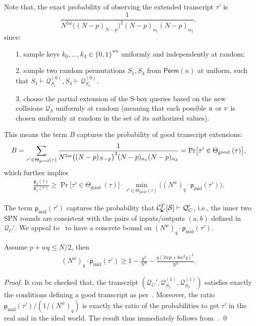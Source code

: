Note that, the exact probability of observing the extended transcript $\tau'$ is
%
%
$$\frac{1}{N^{5w}\big((N-p)_{N-p}\big)^2(N-p)_{\alpha_1}(N-p)_{\alpha_2}},$$
%
since:
%
\begin{itemize}
	\item[1.] sample keys $k_0,\ldots,k_4\in\{0,1\}^{wn}$ uniformly and independently at random;
	\item[2.] sample two random permutations $S_1,S_4$ from $\mathsf{Perm}(n)$ at uniform, such that $S_1\vdash\mathcal{Q}_{S_1}^{(0)},S_4\vdash\mathcal{Q}_{S_4}^{(0)}$.
	\item[3.] choose the partial extension of the S-box queries based on the new collisions $\mathcal{Q}_{S}^{\prime}$ uniformly at random (meaning that each possible $\mathnormal{u}$ or $\mathnormal{v}$ is chosen uniformly at random in the set of its authorized values).
\end{itemize}
%
%
This means the term $B$ captures the probability of good transcript extensions:
%
%
\begin{align}
B=\sum_{\tau^{\prime} \in \Theta_{\mathrm{good}}(\tau)}
\frac{1}{N^{5w}\big((N-p)_{N-p}\big)^2(N-p)_{\alpha_1}(N-p)_{\alpha_2}}={\Pr}\big[ \tau' \in \Theta_{\text {good }}(\tau)\big],   \notag
\end{align}
%
%
which further implies
%
%
\begin{align}
\frac{\mathsf{p}_{2}(\tau)}{\mathsf{p}_{1}(\tau)}   \geq  {\Pr}\big[ \tau' \in \Theta_{\text {good }}(\tau)\big]\cdot
\min_{\tau' \in \Theta_{\mathrm{good}}(\tau)}\big((N^w)_q\cdot\mathsf{p}_{\mathrm{mid}}(\tau')\big). 
\label{eq:ratio-divide-4-rounds}
\end{align}
%
%


The term $\mathsf{p}_{\mathrm{mid}}(\tau')$ captures the probability that $\mathcal{C}_{\mathbf{k}'}^T[\mathcal{S}] \vdash \mathcal{Q}_C'$, i.e., the inner two SPN rounds are consistent with the pairs of inputs/outputs $(a,b)$ defined in $\mathcal{Q}_C'$. We appeal to~\cite{EPRINT:CogLee18} to have a concrete bound on $(N^w)_q\cdot\mathsf{p}_{\mathrm{mid}}(\tau')$.

\begin{lemma}
	\label{lemma:bound-middle-two-rounds}
	
	Assume $p+wq\leq N/2$, then
	\begin{align}
	(N^w)_q\cdot\mathsf{p}_{\mathrm{mid}}(\tau') \geq 1-\frac{q^2}{N^w}-\frac{q(2wp+6w^2q)^2}{N^2}.
	\label{eq:bound-on-epsilon-mid}
	\end{align}
\end{lemma}
\begin{proof}
	It can be checked that, the transcript $(\mathcal{Q}_C',\mathcal{Q}_{S_2}^{(1)},\mathcal{Q}_{S_3}^{(1)})$ satisfies exactly the conditions defining a good transcript as per~\cite[page 16]{EPRINT:CogLee18}. Moreover,
	the ratio $\mathsf{p}_{\mathrm{mid}}(\tau')/(1/(N^w)_q)$ is exactly the ratio of the probabilities to get $\tau'$ in the real and in the ideal world. The result thus immediately follows from~\cite[Lemma 9]{EPRINT:CogLee18}.             \qed
\end{proof}




